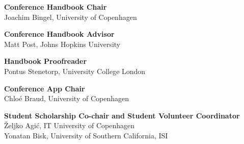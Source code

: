 {\bf Conference Handbook Chair}\\
Joachim Bingel, University of Copenhagen

{\bf Conference Handbook Advisor}\\
Matt Post, Johns Hopkins University

{\bf Handbook Proofreader}\\
Pontus Stenetorp, University College London

{\bf Conference App Chair}\\
Chloé Braud, University of Copenhagen

{\bf Student Scholarship Co-chair and Student Volunteer Coordinator}\\
Željko Agić, IT University of Copenhagen\\
Yonatan Bisk, University of Southern California, ISI

